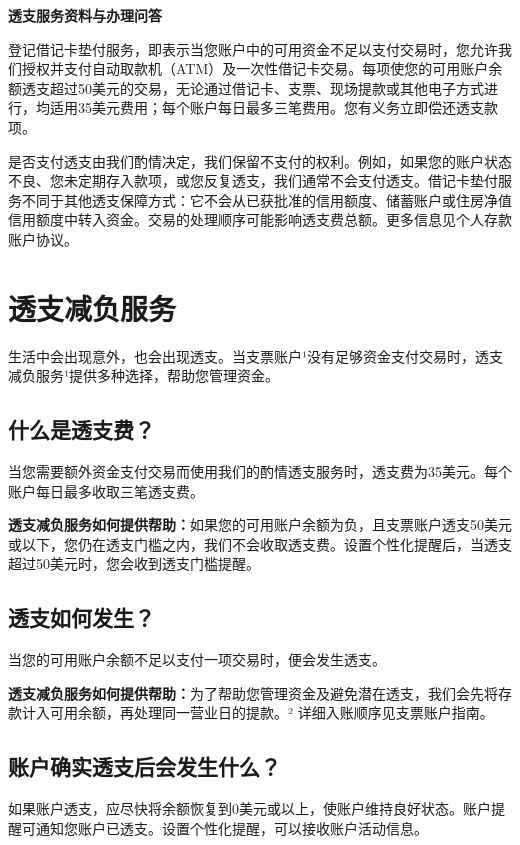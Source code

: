 \documentclass[UTF8,fontset=none,11pt,a4paper]{ctexart}
\begin{document}
{\noindent\fontsize{20}{25}\selectfont\bfseries 透支服务资料与办理问答\par}
\vspace{10pt}
登记借记卡垫付服务，即表示当您账户中的可用资金不足以支付交易时，您允许我们授权并支付自动取款机（ATM）及一次性借记卡交易。每项使您的可用账户余额透支超过50美元的交易，无论通过借记卡、支票、现场提款或其他电子方式进行，均适用35美元费用；每个账户每日最多三笔费用。您有义务立即偿还透\allowbreak\mbox{支款项。}


是否支付透支由我们酌情决定，我们保留不支付的权利。例如，如果您的账户状态不良、您未定期存入款项，或您反复透支，我们通常不会支付透支。借记卡垫付服务不同于其他透支保障方式：它不会从已获批准的信用额度、储蓄账户或住房净值信用额度中转入资金。交易的处理顺序可能影响透支费总额。更多信息见个人存款\allowbreak\mbox{账户协议。}


\section*{透支减负服务}
生活中会出现意外，也会出现透支。当支票账户¹没有足够资金支付交易时，透支减负服务¹提供多种选择，帮助您\allowbreak\mbox{管理资金。}


\subsection*{什么是透支费？}
当您需要额外资金支付交易而使用我们的酌情透支服务时，透支费为35美元。每个账户每日最多收取三\allowbreak\mbox{笔透支费。}


\textbf{透支减负服务如何提供帮助：}如果您的可用账户余额为负，且支票账户透支50美元或以下，您仍在透支门槛之内，我们不会收取透支费。设置个性化提醒后，当透支超过50美元时，您会收到透支\allowbreak\mbox{门槛提醒。}


\subsection*{透支如何发生？}
当您的可用账户余额不足以支付一项交易时，便会\allowbreak\mbox{发生透支。}


\textbf{透支减负服务如何提供帮助：}为了帮助您管理资金及避免潜在透支，我们会先将存款计入可用余额，再处理同一营业日的提款。² 详细入账顺序见支票\allowbreak\mbox{账户指南。}


\subsection*{账户确实透支后会发生什么？}
如果账户透支，应尽快将余额恢复到0美元或以上，使账户维持良好状态。账户提醒可通知您账户已透支。设置个性化提醒，可以接收账户\allowbreak\mbox{活动信息。}
\end{document}
